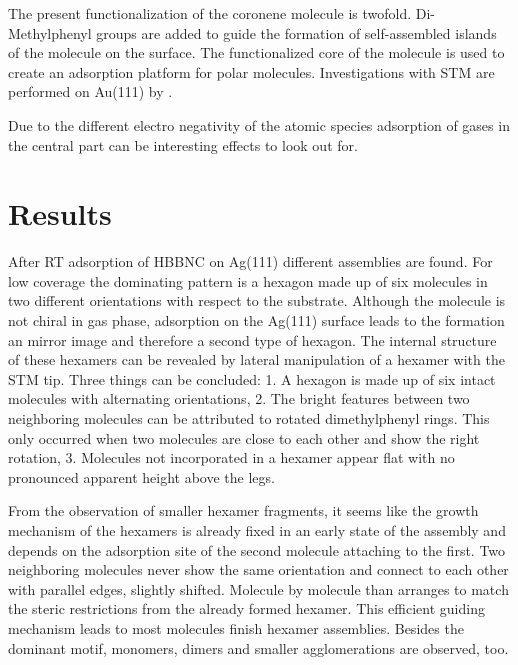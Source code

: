 The present functionalization of the coronene molecule is twofold. Di-Methylphenyl groups are added to guide the formation of self-assembled islands of the molecule on the surface. The functionalized core of the molecule is used to create an adsorption platform for polar molecules.
Investigations with STM are performed on Au(111) by \cite{Krieg_construction_2015}.

Due to the different electro negativity of the atomic species adsorption of gases in the central part can be interesting effects to look out for.

\section{Results}
After RT adsorption of HBBNC on Ag(111) different assemblies are found. For low coverage the dominating pattern is a hexagon made up of six molecules in two different orientations with respect to the substrate. Although the molecule is not chiral in gas phase, adsorption on the Ag(111) surface leads to the formation an mirror image and therefore a second type of hexagon. The internal structure of these hexamers can be revealed by lateral manipulation of a hexamer with the STM tip. Three things can be concluded: 1. A hexagon is made up of six intact molecules with alternating orientations, 2. The bright features between two neighboring molecules can be attributed to rotated dimethylphenyl rings. This only occurred when two molecules are close to each other and show the right rotation, 3. Molecules not incorporated in a hexamer appear flat with no pronounced apparent height above the legs.

From the observation of smaller hexamer fragments, it seems like the growth mechanism of the hexamers is already fixed in an early state of the assembly and depends on the adsorption site of the second molecule attaching to the first. Two neighboring molecules never show the same orientation and connect to each other with parallel edges, slightly shifted.
Molecule by molecule than arranges to match the steric restrictions from the already formed hexamer. This efficient guiding mechanism leads to most molecules finish hexamer assemblies. 
Besides the dominant motif, monomers, dimers and smaller agglomerations are observed, too.


